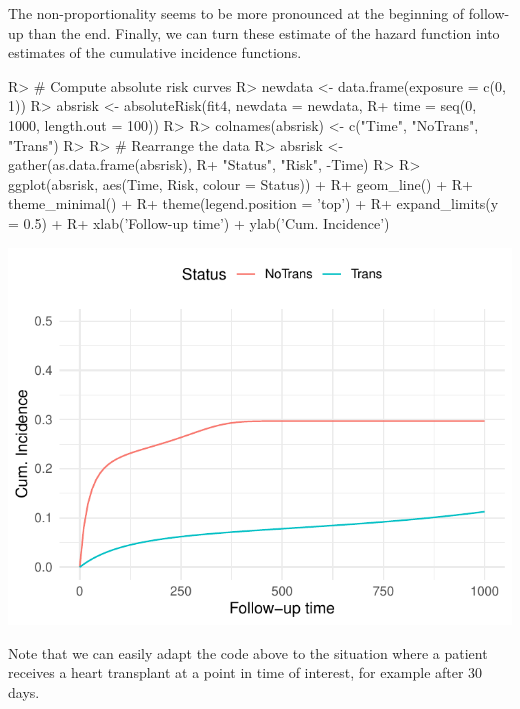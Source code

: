 \documentclass[
]{jss}
\begin{document}
The non-proportionality seems to be more pronounced at the beginning of
follow-up than the end. Finally, we can turn these estimate of the
hazard function into estimates of the cumulative incidence functions.

\begin{CodeChunk}

\begin{CodeInput}
R> # Compute absolute risk curves
R> newdata <- data.frame(exposure = c(0, 1))
R> absrisk <- absoluteRisk(fit4, newdata = newdata, 
R+                         time = seq(0, 1000, length.out = 100))
R> 
R> colnames(absrisk) <- c("Time", "NoTrans", "Trans")
R> 
R> # Rearrange the data
R> absrisk <- gather(as.data.frame(absrisk),
R+                   "Status", "Risk", -Time)
R>  
R> ggplot(absrisk, aes(Time, Risk, colour = Status)) +
R+   geom_line() +
R+   theme_minimal() +
R+   theme(legend.position = 'top') +
R+   expand_limits(y = 0.5) +
R+   xlab('Follow-up time') + ylab('Cum. Incidence')
\end{CodeInput}


\begin{center}\includegraphics{../figures/stanford-risk-1} \end{center}

\end{CodeChunk}

Note that we can easily adapt the code above to the situation where a
patient receives a heart transplant at a point in time of interest, for
example after 30 days.
\end{document}
